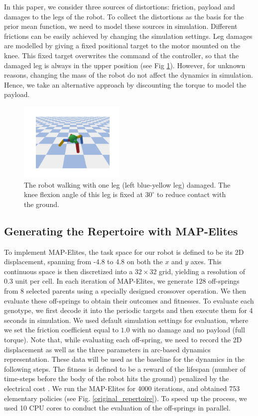 In this paper, we consider three sources of distortions: friction, payload and damages to the legs of the robot.
To collect the distortions as the basis for the prior mean function, we need to model these sources in simulation.
Different frictions can be easily achieved by changing the simulation settings.
Leg damages are modelled by giving a fixed positional target to the motor mounted on the knee.
This fixed target overwrites the command of the controller, so that the damaged leg is always in the upper position (see Fig \ref{damaged_robot}).
However, for unknown reasons, changing the mass of the robot do not affect the dynamics in simulation. 
Hence, we take an alternative approach by discounting the torque to model the payload.
%
%
\begin{figure}[h]
\centering
\includegraphics[width=0.45\textwidth]{damaged_robot.pdf}
\caption{The robot walking with one leg (left blue-yellow leg) damaged.
The knee flexion angle of this leg is fixed at $30^{\circ}$ to reduce contact with the ground.
}
\label{damaged_robot}
\end{figure}




\subsection{Generating the Repertoire with MAP-Elites}
To implement MAP-Elites, the task space for our robot is defined to be its 2D displacement, spanning from -4.8 to 4.8 on both the $x$ and $y$ axes. 
This continuous space is then discretized into a $32 \times 32$ grid, yielding a resolution of 0.3 unit per cell.
In each iteration of MAP-Elites, we generate 128 off-springs from 8 selected parents using a specially designed crossover operation.
We then evaluate these off-springs to obtain their outcomes and fitnesses. 
To evaluate each genotype, we first decode it into the periodic targets and then execute them for 4 seconds in simulation.
We used default simulation settings for evaluation, where we set the friction coefficient equal to $1.0$ with no damage and no payload (full torque).
Note that, while evaluating each off-spring, we need to record the 2D displacement as well as the three parameters in arc-based dynamics representation.
These data will be used as the baseline for the dynamics in the following steps. 
The fitness is defined to be a reward of the lifespan (number of time-steps before the body of the robot hits the ground) penalized by the electrical cost \cite{QDgym}.
We run the MAP-Elites for 4000 iterations, and obtained 753 elementary policies (see Fig. \ref{original_repertoire}).
To speed up the process, we used 10 CPU cores to conduct the evaluation of the off-springs in parallel.


